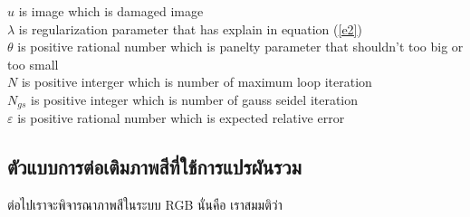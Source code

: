 \documentclass[hidelinks, a4paper,12pt]{article}
\numberwithin{equation}{section}							%
\numberwithin{equation}{section}
\begin{document}
{\begin{itemize}
\begin{algorithm}[H]
{			\hspace{1cm} $u$ is image which is damaged image \\
			\hspace{1cm} $\lambda$ is regularization parameter that has explain in equation (\ref{e2}) \\
			\hspace{1cm} $\theta$ is positive rational number which is panelty parameter that shouldn't too big or too small \\
			\hspace{1cm} $N$ is positive interger  which is number of maximum loop iteration \\
			\hspace{1cm} $N_{gs}$ is positive integer which is number of gauss seidel iteration \\
			\hspace{1cm} $\varepsilon$ is positive rational number  which is expected relative error \\
		}
	\end{algorithm}
\end{itemize}

\subsection{ตัวแบบการต่อเติมภาพสีที่ใช้การแปรผันรวม}\label{inpaint-model-color}

\hspace{1cm} ต่อไปเราจะพิจารณาภาพสีในระบบ RGB นั่นคือ เราสมมติว่า

}
\end{document}
